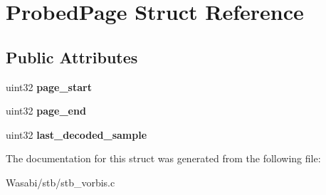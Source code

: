 \hypertarget{struct_probed_page}{}\section{Probed\+Page Struct Reference}
\label{struct_probed_page}
\subsection*{Public Attributes}
\begin{DoxyCompactItemize}
\item 
uint32 {\bfseries page\+\_\+start}\hypertarget{struct_probed_page_aaa50c148dd63b1c5582963aab9a987d9}{}\label{struct_probed_page_aaa50c148dd63b1c5582963aab9a987d9}

\item 
uint32 {\bfseries page\+\_\+end}\hypertarget{struct_probed_page_a70bebe23790fc29c0e904c43e26aac1a}{}\label{struct_probed_page_a70bebe23790fc29c0e904c43e26aac1a}

\item 
uint32 {\bfseries last\+\_\+decoded\+\_\+sample}\hypertarget{struct_probed_page_ad0e2a35e768907ee5f1b7ef9fed20e81}{}\label{struct_probed_page_ad0e2a35e768907ee5f1b7ef9fed20e81}

\end{DoxyCompactItemize}


The documentation for this struct was generated from the following file\+:\begin{DoxyCompactItemize}
\item 
Wasabi/stb/stb\+\_\+vorbis.\+c\end{DoxyCompactItemize}

